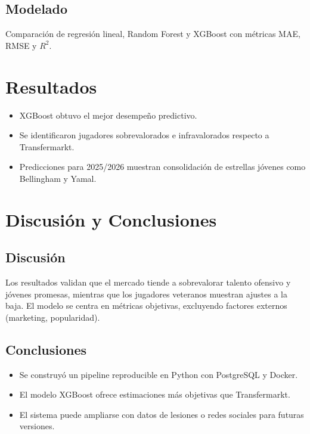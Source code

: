 \documentclass[12pt,letterpaper]{article}
\begin{document}
\subsection{Modelado}
Comparación de regresión lineal, Random Forest y XGBoost con métricas MAE, RMSE y $R^2$.

\section{Resultados}
\begin{itemize}
    \item XGBoost obtuvo el mejor desempeño predictivo.
    \item Se identificaron jugadores sobrevalorados e infravalorados respecto a Transfermarkt.
    \item Predicciones para 2025/2026 muestran consolidación de estrellas jóvenes como Bellingham y Yamal.
\end{itemize}

\section{Discusión y Conclusiones}
\subsection{Discusión}
Los resultados validan que el mercado tiende a sobrevalorar talento ofensivo y jóvenes promesas, mientras que los jugadores veteranos muestran ajustes a la baja. 
El modelo se centra en métricas objetivas, excluyendo factores externos (marketing, popularidad).

\subsection{Conclusiones}
\begin{itemize}
    \item Se construyó un pipeline reproducible en Python con PostgreSQL y Docker.
    \item El modelo XGBoost ofrece estimaciones más objetivas que Transfermarkt.
    \item El sistema puede ampliarse con datos de lesiones o redes sociales para futuras versiones.

\end{itemize}
\end{document}
